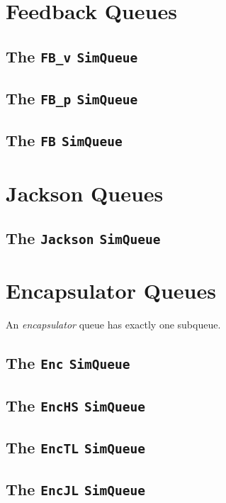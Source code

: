 \documentclass[12pt]{book}
\begin{document}
\section{Feedback Queues}

\subsection{The \lstinline{FB_v} \lstinline{SimQueue}}

\subsection{The \lstinline{FB_p} \lstinline{SimQueue}}

\subsection{The \lstinline{FB} \lstinline{SimQueue}}

\section{Jackson Queues}

\subsection{The \lstinline{Jackson} \lstinline{SimQueue}}

\section{Encapsulator Queues}

An {\em encapsulator\/} queue has exactly one subqueue.

\subsection{The \lstinline{Enc} \lstinline{SimQueue}}

\subsection{The \lstinline{EncHS} \lstinline{SimQueue}}

\subsection{The \lstinline{EncTL} \lstinline{SimQueue}}

\subsection{The \lstinline{EncJL} \lstinline{SimQueue}}
\end{document}
